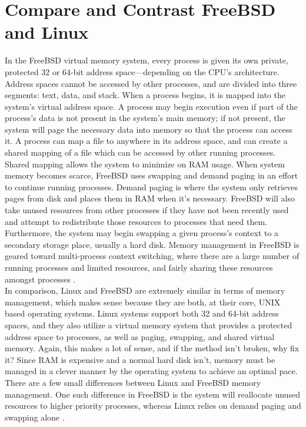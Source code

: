\documentclass[letterpaper,10pt,draftclsnofoot,onecolumn]{IEEEtran}
\begin{document}
\section{Compare and Contrast FreeBSD and Linux}
In the FreeBSD virtual memory system, every process is given its own private, protected 32 or 64-bit address space–--depending on the CPU’s architecture. Address spaces cannot be accessed by other processes, and are divided into three segments: text, data, and stack. When a process begins, it is mapped into the system’s virtual address space. A process may begin execution even if part of the process’s data is not present in the system’s main memory; if not present, the system will page the necessary data into memory so that the process can access it. A process can map a file to anywhere in its address space, and can create a shared mapping of a file which can be accessed by other running processes. Shared mapping allows the system to minimize on RAM usage. When system memory becomes scarce, FreeBSD uses swapping and demand paging in an effort to continue running processes. Demand paging is where the system only retrieves pages from disk and places them in RAM when it’s necessary. FreeBSD will also take unused resources from other processes if they have not been recently used and attempt to redistribute those resources to processes that need them. Furthermore, the system may begin swapping a given process’s context to a secondary storage place, usually a hard disk. Memory management in FreeBSD is geared toward multi-process context switching, where there are a large number of running processes and limited resources, and fairly sharing these resources amongst processes \cite{FreeBSD1} \cite{FreeBSD2}.\\

In comparison, Linux and FreeBSD are extremely similar in terms of memory management, which makes sense because they are both, at their core, UNIX based operating systems. Linux systems support both 32 and 64-bit address spaces, and they also utilize a virtual memory system that provides a protected address space to processes, as well as paging, swapping, and shared virtual memory. Again, this makes a lot of sense, and if the method isn’t broken, why fix it? Since RAM is expensive and a normal hard disk isn’t, memory must be managed in a clever manner by the operating system to achieve an optimal pace. There are a few small differences between Linux and FreeBSD memory management. One such difference in FreeBSD is the system will reallocate unused resources to higher priority processes, whereas Linux relies on demand paging and swapping alone \cite{Linux1} \cite{Linux2}.\\
\end{document}
